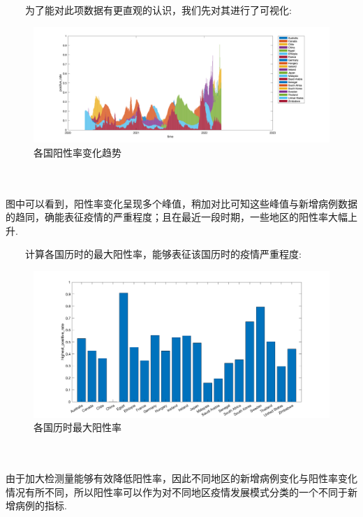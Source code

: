 \documentclass[a4paper, titlepage]{article}
\begin{document}
    　　为了能对此项数据有更直观的认识，我们先对其进行了可视化:\\
    \begin{minipage}{\textwidth}
        \begin{figure}[H]
            \centering
            \includegraphics[width=1.1\textwidth]{./images/PositiveRate_1.png}
            \vspace{-2.5em}
            \caption{各国阳性率变化趋势}
            \label{images:PositiveRate_1}
        \end{figure}
    \end{minipage}\\\quad\\
    图中可以看到，阳性率变化呈现多个峰值，稍加对比可知这些峰值与新增病例数据的趋同，确能表征疫情的严重程度；且在最近一段时期，一些地区的阳性率大幅上升. 

    　　计算各国历时的最大阳性率，能够表征该国历时的疫情严重程度:\\
    \begin{minipage}{\textwidth}
        \begin{figure}[H]
            \centering
            \includegraphics[width=\textwidth]{./images/PositiveRate_2.png}
            \caption{各国历时最大阳性率}
            \label{images:PositiveRate_2}
        \end{figure}
    \end{minipage}\\\quad\\
    由于加大检测量能够有效降低阳性率，因此不同地区的新增病例变化与阳性率变化情况有所不同，所以阳性率可以作为对不同地区疫情发展模式分类的一个不同于新增病例的指标. 
\end{document}
